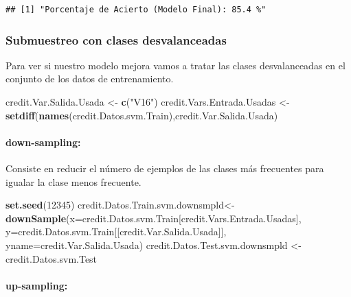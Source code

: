 \documentclass[
]{article}
\newenvironment{Shaded}{\begin{snugshade}}{\end{snugshade}}
\newcommand{\AttributeTok}[1]{\textcolor[rgb]{0.13,0.29,0.53}{#1}}
\newcommand{\DecValTok}[1]{\textcolor[rgb]{0.00,0.00,0.81}{#1}}
\newcommand{\FunctionTok}[1]{\textcolor[rgb]{0.13,0.29,0.53}{\textbf{#1}}}
\newcommand{\NormalTok}[1]{#1}
\newcommand{\OtherTok}[1]{\textcolor[rgb]{0.56,0.35,0.01}{#1}}
\newcommand{\StringTok}[1]{\textcolor[rgb]{0.31,0.60,0.02}{#1}}
\begin{document}
\begin{verbatim}
## [1] "Porcentaje de Acierto (Modelo Final): 85.4 %"
\end{verbatim}

\hypertarget{submuestreo-con-clases-desvalanceadas}{%
\subsubsection{Submuestreo con clases
desvalanceadas}\label{submuestreo-con-clases-desvalanceadas}}

Para ver si nuestro modelo mejora vamos a tratar las clases
desvalanceadas en el conjunto de los datos de entrenamiento.

\begin{Shaded}
\begin{Highlighting}[]
\NormalTok{credit.Var.Salida.Usada }\OtherTok{\textless{}{-}} \FunctionTok{c}\NormalTok{(}\StringTok{"V16"}\NormalTok{)}
\NormalTok{credit.Vars.Entrada.Usadas }\OtherTok{\textless{}{-}} \FunctionTok{setdiff}\NormalTok{(}\FunctionTok{names}\NormalTok{(credit.Datos.svm.Train),credit.Var.Salida.Usada)}
\end{Highlighting}
\end{Shaded}

\hypertarget{down-sampling}{%
\paragraph{down-sampling:}\label{down-sampling}}

Consiste en reducir el número de ejemplos de las clases más frecuentes
para igualar la clase menos frecuente.

\begin{Shaded}
\begin{Highlighting}[]
\FunctionTok{set.seed}\NormalTok{(}\DecValTok{12345}\NormalTok{)}
\NormalTok{credit.Datos.Train.svm.downsmpld}\OtherTok{\textless{}{-}}\FunctionTok{downSample}\NormalTok{(}\AttributeTok{x=}\NormalTok{credit.Datos.svm.Train[credit.Vars.Entrada.Usadas],}
                                       \AttributeTok{y=}\NormalTok{credit.Datos.svm.Train[[credit.Var.Salida.Usada]],}
                                       \AttributeTok{yname=}\NormalTok{credit.Var.Salida.Usada)}
\NormalTok{credit.Datos.Test.svm.downsmpld }\OtherTok{\textless{}{-}}\NormalTok{ credit.Datos.svm.Test}
\end{Highlighting}
\end{Shaded}

\hypertarget{up-sampling}{%
\paragraph{up-sampling:}\label{up-sampling}}
\end{document}
